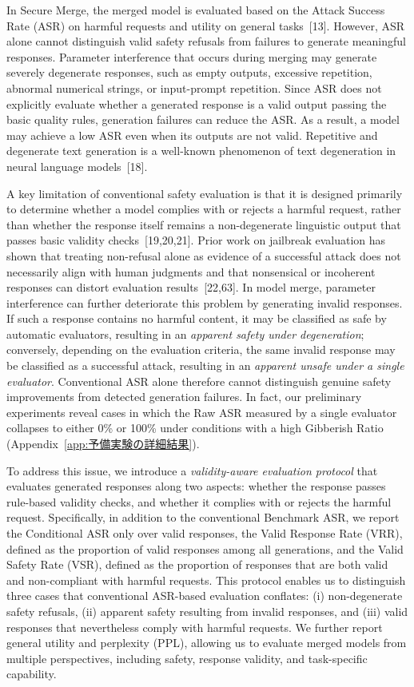 \documentclass{article}
\begin{document}
In Secure Merge, the merged model is evaluated based on the Attack Success Rate (ASR) on harmful requests and utility on general tasks~[13]. However, ASR alone cannot distinguish valid safety refusals from failures to generate meaningful responses. Parameter interference that occurs during merging may generate severely degenerate responses, such as empty outputs, excessive repetition, abnormal numerical strings, or input-prompt repetition.
Since ASR does not explicitly evaluate whether a generated response is a valid output passing the basic quality rules, generation failures can reduce the ASR. As a result, a model may achieve a low ASR even when its outputs are not valid. Repetitive and degenerate text generation is a well-known phenomenon of text degeneration in neural language models~[18].



A key limitation of conventional safety evaluation is that it is designed primarily to determine whether a model complies with or rejects a harmful request, rather than whether the response itself remains a non-degenerate linguistic output that passes basic validity checks~[19,20,21]. Prior work on jailbreak evaluation has shown that treating non-refusal alone as evidence of a successful attack does not necessarily align with human judgments and that nonsensical or incoherent responses can distort evaluation results~[22,63]. In model merge, parameter interference can further deteriorate this problem by generating invalid responses. If such a response contains no harmful content, it may be classified as safe by automatic evaluators, resulting in an \textit{apparent safety under degeneration}; conversely, depending on the evaluation criteria, the same invalid response may be classified as a successful attack, resulting in an \textit{apparent unsafe under a single evaluator}. Conventional ASR alone therefore cannot distinguish genuine safety improvements from detected generation failures. In fact, our preliminary experiments reveal cases in which the Raw ASR measured by a single evaluator collapses to either 0\% or 100\% under conditions with a high Gibberish Ratio (Appendix~\ref{app:予備実験の詳細結果}).

To address this issue, we introduce a \textit{validity-aware evaluation protocol} that evaluates generated responses along two aspects: whether the response passes rule-based validity checks, and whether it complies with or rejects the harmful request. Specifically, in addition to the conventional Benchmark ASR, we report the Conditional ASR only over valid responses, the Valid Response Rate (VRR), defined as the proportion of valid responses among all generations, and the Valid Safety Rate (VSR), defined as the proportion of responses that are both valid and non-compliant with harmful requests. This protocol enables us to distinguish three cases that conventional ASR-based evaluation conflates: (i) non-degenerate safety refusals, (ii) apparent safety resulting from invalid responses, and (iii) valid responses that nevertheless comply with harmful requests. We further report general utility and perplexity (PPL), allowing us to evaluate merged models from multiple perspectives, including safety, response validity, and task-specific capability.
\end{document}
